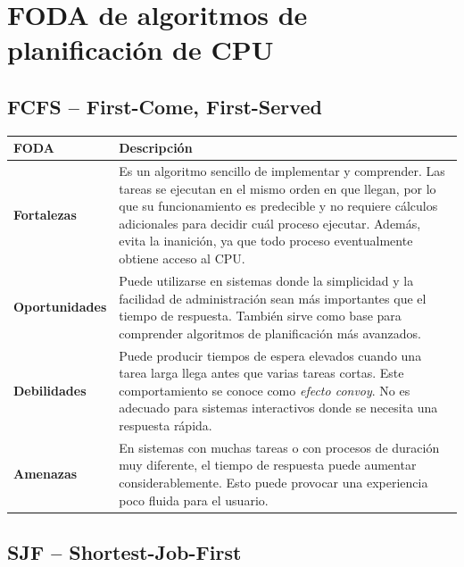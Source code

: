 \section{FODA de algoritmos de planificación de CPU}

\subsection{FCFS -- First-Come, First-Served}

\begin{center}
\begin{tabular}{|p{}|p{}|}
\hline
\textbf{FODA} & \textbf{Descripción} \\ \hline

\textbf{Fortalezas} &
Es un algoritmo sencillo de implementar y comprender. Las tareas se ejecutan en el mismo orden en que llegan, por lo que su funcionamiento es predecible y no requiere cálculos adicionales para decidir cuál proceso ejecutar. Además, evita la inanición, ya que todo proceso eventualmente obtiene acceso al CPU. \\ \hline

\textbf{Oportunidades} &
Puede utilizarse en sistemas donde la simplicidad y la facilidad de administración sean más importantes que el tiempo de respuesta. También sirve como base para comprender algoritmos de planificación más avanzados. \\ \hline

\textbf{Debilidades} &
Puede producir tiempos de espera elevados cuando una tarea larga llega antes que varias tareas cortas. Este comportamiento se conoce como \textit{efecto convoy}. No es adecuado para sistemas interactivos donde se necesita una respuesta rápida. \\ \hline

\textbf{Amenazas} &
En sistemas con muchas tareas o con procesos de duración muy diferente, el tiempo de respuesta puede aumentar considerablemente. Esto puede provocar una experiencia poco fluida para el usuario. \\ \hline

\end{tabular}
\end{center}

\subsection{SJF -- Shortest-Job-First}

